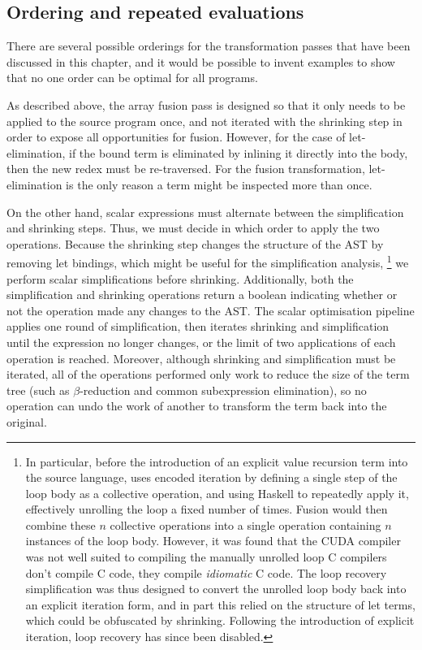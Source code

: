 \subsection{Ordering and repeated evaluations}

There are several possible orderings for the transformation passes that have
been discussed in this chapter, and it would be possible to invent examples to
show that no one order can be optimal for all programs.

As described above, the array fusion pass is designed so that it only needs to
be applied to the source program once, and not iterated with the shrinking step
in order to expose all opportunities for fusion. However, for the case of
let-elimination, if the bound term is eliminated by inlining it directly into
the body, then the new redex must be re-traversed. For the fusion
transformation, let-elimination is the only reason a term might be inspected
more than once.

On the other hand, scalar expressions must alternate between the simplification
and shrinking steps. Thus, we must decide in which order to apply the two
operations. Because the shrinking step changes the structure of the AST by
removing let bindings, which might be useful for the simplification analysis,%
\footnote{In particular, before the introduction of an explicit value recursion
term into the source language, uses encoded iteration by defining a single step
of the loop body as a collective operation, and using Haskell to repeatedly
apply it, effectively unrolling the loop a fixed number of times. Fusion would
then combine these $n$ collective operations into a single operation containing
$n$ instances of the loop body. However, it was found that the CUDA compiler was
not well suited to compiling the manually unrolled loop C compilers don't
compile C code, they compile \emph{idiomatic} C code. The loop recovery
simplification was thus designed to convert the unrolled loop body back into an
explicit iteration form, and in part this relied on the structure of let terms,
which could be obfuscated by shrinking. Following the introduction of explicit
iteration, loop recovery has since been disabled.}
we perform scalar simplifications before shrinking. Additionally, both the
simplification and shrinking operations return a boolean indicating whether or
not the operation made any changes to the AST. The scalar optimisation pipeline
applies one round of simplification, then iterates shrinking and simplification
until the expression no longer changes, or the limit of two applications of each
operation is reached. Moreover, although shrinking and simplification must be
iterated, all of the operations performed only work to reduce the size of the
term tree (such as $\beta$-reduction and common subexpression elimination), so
no operation can undo the work of another to transform the term back into the
original.


